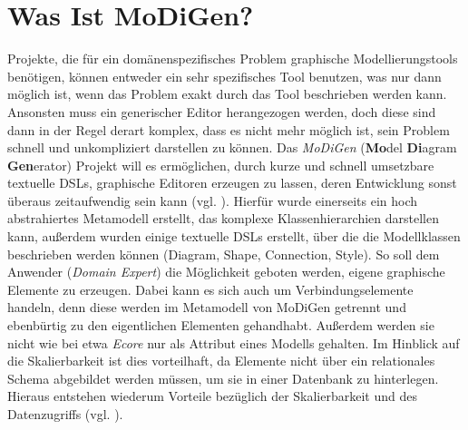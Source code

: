 \section{Was Ist MoDiGen?}\label{modigen}
Projekte, die für ein domänenspezifisches Problem graphische Modellierungstools benötigen, können entweder ein sehr spezifisches Tool benutzen, was nur dann möglich ist, wenn das Problem exakt durch das Tool beschrieben werden kann. Ansonsten muss ein generischer Editor herangezogen werden, doch diese sind dann in der Regel derart komplex, dass es nicht mehr möglich ist, sein Problem schnell und unkompliziert darstellen zu können. Das \textit{MoDiGen} (\textbf{Mo}del \textbf{Di}agram \textbf{Gen}erator) Projekt will es ermöglichen, durch kurze und schnell umsetzbare textuelle DSLs, graphische Editoren erzeugen zu lassen, deren Entwicklung sonst überaus zeitaufwendig sein kann (vgl. ). Hierfür wurde einerseits ein hoch abstrahiertes Metamodell erstellt, das komplexe Klassenhierarchien darstellen kann, außerdem wurden einige textuelle DSLs erstellt, über die die Modellklassen beschrieben werden können (Diagram, Shape, Connection, Style). So soll dem Anwender (\textit{Domain Expert}) die Möglichkeit geboten werden, eigene graphische Elemente zu erzeugen. Dabei kann es sich auch um Verbindungselemente handeln, denn diese werden im Metamodell von MoDiGen getrennt und ebenbürtig zu den eigentlichen Elementen gehandhabt. Außerdem werden sie nicht wie bei etwa \textit{Ecore} nur als Attribut eines Modells gehalten. Im Hinblick auf die Skalierbarkeit ist dies vorteilhaft, da Elemente nicht über ein relationales Schema abgebildet werden müssen, um sie in einer Datenbank zu hinterlegen. Hieraus entstehen wiederum Vorteile bezüglich der Skalierbarkeit und des Datenzugriffs (vgl. ).
